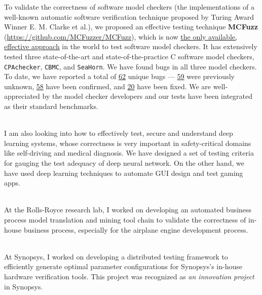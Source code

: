 \documentclass[margin]{res}
\begin{document}
\begin{resume}
To validate the correctness of software model checkers (the implementations of a well-known automatic software verification technique proposed by Turing Award Winner E. M. Clarke et al.), we proposed an effective testing technique \textbf{MCFuzz} (\url{https://github.com/MCFuzzer/MCFuzz}), which is now \underline{the only available, effective approach} in the world to test software model checkers. It has extensively tested three state-of-the-art and state-of-the-practice C software model checkers, \texttt{CPAchecker}, \texttt{CBMC}, and \texttt{SeaHorn}. We have found bugs in all
three model checkers. To date, we have reported a total of \underline{62} unique bugs --- \underline{59} were previously unknown, \underline{58} have been confirmed, and \underline{20} have been fixed. We are well-appreciated by the model checker developers and our tests have been integrated as their standard benchmarks.

\\
I am also looking into how to effectively test, secure and understand deep learning systems, whose correctness is very important in safety-critical domains like self-driving and medical diagnosis. We have designed a set of testing criteria for gauging the test adequacy of deep neural network. On the other hand, we have used deep learning techniques to automate GUI design and test gaming apps.

\\
At the Rolls-Royce research lab, I worked on developing an automated business process model translation and mining tool chain to validate the correctness of in-house business process, especially for the airplane engine development process.  

\\
At Synopsys, I worked on developing a distributed testing framework to efficiently generate optimal parameter configurations for Synopsys's in-house hardware verification tools. This project was recognized as \emph{an innovation project} in Synopsys.


\end{resume}
\end{document}

